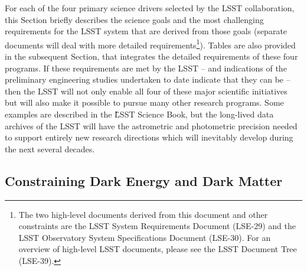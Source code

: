 For each of the four primary science drivers selected by the LSST collaboration,
this Section briefly describes the science goals and the most challenging
requirements for the LSST system that are derived from those goals (separate
documents will deal with more detailed requirements\footnote{The two
high-level documents derived from this document and other constraints are the
LSST System Requirements Document (LSE-29) and the LSST Observatory System
Specifications Document (LSE-30). For an overview of high-level LSST documents,
please see the LSST Document Tree (LSE-39).}).
Tables are also provided in the subsequent Section, that
integrates the detailed requirements of these four programs. If these
requirements are met by the LSST -- and indications of the preliminary
engineering studies undertaken to date indicate that they can be -- then
the LSST will not only enable all four of these major scientific
initiatives but will also make it possible to pursue many other research
programs. Some examples are described in the \G{LSST Science Book},
but the long-lived
data archives of the LSST will have the astrometric and photometric
precision needed to support entirely new research directions which will
inevitably develop during the next several decades.



\subsection{Constraining Dark Energy and Dark Matter \label{sec:DE}}

